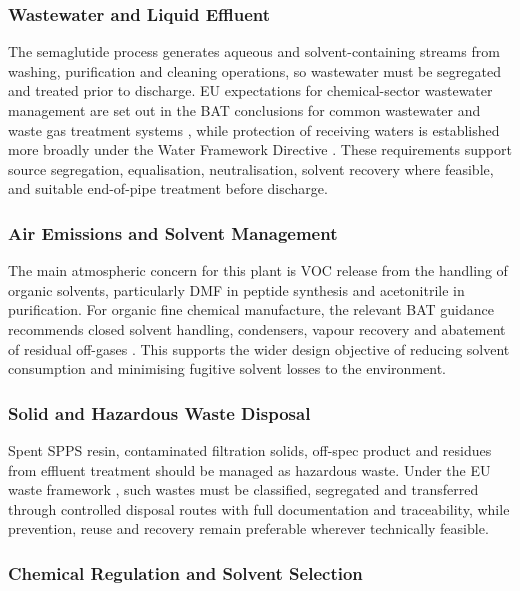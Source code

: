 \subsubsection{Wastewater and Liquid Effluent}

The semaglutide process generates aqueous and solvent-containing streams from washing, purification and cleaning operations, so wastewater must be segregated and treated prior to discharge. EU expectations for chemical-sector wastewater management are set out in the BAT conclusions for common wastewater and waste gas treatment systems \cite{EC_BAT_2016}, while protection of receiving waters is established more broadly under the Water Framework Directive \cite{EU_WFD_2000}. These requirements support source segregation, equalisation, neutralisation, solvent recovery where feasible, and suitable end-of-pipe treatment before discharge.

\subsubsection{Air Emissions and Solvent Management}

The main atmospheric concern for this plant is VOC release from the handling of organic solvents, particularly DMF in peptide synthesis and acetonitrile in purification. For organic fine chemical manufacture, the relevant BAT guidance recommends closed solvent handling, condensers, vapour recovery and abatement of residual off-gases \cite{EC_OFC_BREF_2006}. This supports the wider design objective of reducing solvent consumption and minimising fugitive solvent losses to the environment.

\subsubsection{Solid and Hazardous Waste Disposal}

Spent SPPS resin, contaminated filtration solids, off-spec product and residues from effluent treatment should be managed as hazardous waste. Under the EU waste framework \cite{EU_WasteDir_2008}, such wastes must be classified, segregated and transferred through controlled disposal routes with full documentation and traceability, while prevention, reuse and recovery remain preferable wherever technically feasible.

\subsubsection{Chemical Regulation and Solvent Selection}

